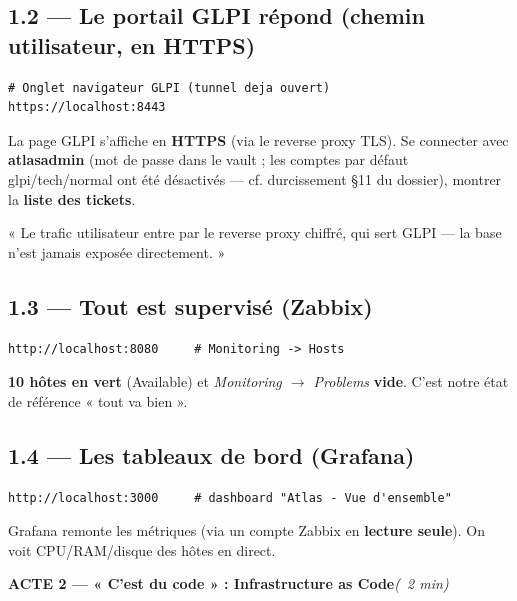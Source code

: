 \documentclass[11pt,a4paper]{article}
\newcommand{\acte}[2]{%
  \begin{tcolorbox}[enhanced,colback=atlasdark,colframe=atlasdark,coltext=white,
    sharp corners,boxrule=0pt,left=3mm,right=3mm,top=2mm,bottom=2mm,
    before skip=10pt,after skip=6pt]%
    {\bfseries\large #1}\dur{#2}%
  \end{tcolorbox}}
\newcommand{\cmd}[1]{{\ttfamily #1}}
\newcommand{\dur}[1]{\hfill{\small\color{codecom}\itshape (#1)}}
\begin{document}
\subsection*{1.2 — Le portail GLPI répond (chemin utilisateur, en HTTPS)}
\begin{lstlisting}[style=bash]
# Onglet navigateur GLPI (tunnel deja ouvert)
https://localhost:8443
\end{lstlisting}
\begin{montrer}
La page GLPI s'affiche en \textbf{HTTPS} (via le reverse proxy TLS). Se connecter avec
\textbf{atlasadmin} (mot de passe dans le vault ; les comptes par défaut glpi/tech/normal
ont été désactivés — cf. durcissement §11 du dossier), montrer la \textbf{liste des tickets}.
\end{montrer}
\begin{dire}
« Le trafic utilisateur entre par le reverse proxy chiffré, qui sert GLPI — la base
n'est jamais exposée directement. »
\end{dire}

\subsection*{1.3 — Tout est supervisé (Zabbix)}
\begin{lstlisting}[style=bash]
http://localhost:8080     # Monitoring -> Hosts
\end{lstlisting}
\begin{montrer}
\textbf{10 hôtes en vert} (\cmd{Available}) et \emph{Monitoring $\rightarrow$ Problems}
\textbf{vide}. C'est notre état de référence « tout va bien ».
\end{montrer}

\subsection*{1.4 — Les tableaux de bord (Grafana)}
\begin{lstlisting}[style=bash]
http://localhost:3000     # dashboard "Atlas - Vue d'ensemble"
\end{lstlisting}
\begin{montrer}
Grafana remonte les métriques (via un compte Zabbix en \textbf{lecture seule}). On voit
CPU/RAM/disque des hôtes en direct.
\end{montrer}

\acte{ACTE 2 — « C'est du code » : Infrastructure as Code}{~2 min}
\end{document}
